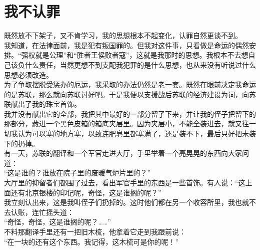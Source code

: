 \fancyhead[RO]{\thepage} %
\fancyhead[LE]{\thepage} %
\chapter*{我不认罪}
既然放不下架子，又不肯学习，我的思想根本不起变化，认罪自然更谈不到。\\

我知道，在法律面前，我是犯有叛国罪的。但我对这件事，只看做是命运的偶然安排。“强权就是公理”和“胜者王侯败者寇”，这就是我那时的思想。我根本不去想自己该负什么责任，当然更想不到支配我犯罪的是什么思想，也从来没有听说过什么思想必须改造。\\

为了争取摆脱受惩办的厄运，我采取的办法仍然是老一套。既然在眼前决定我命运的是苏联，那么就向苏联讨好吧。于是我便以支援战后苏联的经济建设为词，向苏联献出了我的珠宝首饰。\\

我并没有献出它的全部，我把其中最好的一部分留了下来，并让我的侄子把留下的那部分，藏进一个黑色皮箱的箱底夹层里。因为夹层小，不能全装进去，就又往一切我认为可以塞的地方塞，以致连肥皂里都塞满了，还是装不下，最后只好把未装下的扔掉。\\

有一天，苏联的翻译和一个军官走进大厅，手里举着一个亮晃晃的东西向大家问道：\\

“这是谁的？谁放在院子里的废暖气炉片里的？”\\

大厅里的抑留者们都围了过去，看出军官手里的东西是一些首饰。有人说：“这上面还有北京银楼的印记呢，奇怪，这是谁搁的呢？”\\

我立刻认出来，这是我叫侄子们扔掉的。这时他们都在另一个收容所里，我也就不去认账，连忙摇头道：\\

“奇怪，奇怪，这是谁搁的呢？……”\\

不料那翻译手里还有一把旧木梳，他拿着它走到我跟前说：\\

“在一块的还有这个东西。我记得，这木梳可是你的呢！”\\

